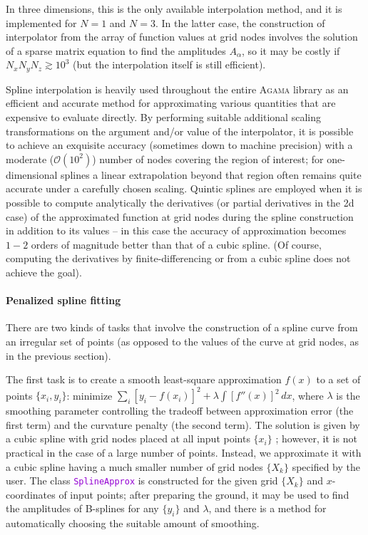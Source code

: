 \documentclass[12pt]{article}
\newcommand{\Agama}{\textsc{Agama}\xspace}
\newcommand{\ttt}[1]{\textcolor{darkviolet}{\texttt{#1}}}
\begin{document}
In three dimensions, this is the only available interpolation method, and it is implemented for $N=1$ and $N=3$. In the latter case, the construction of interpolator from the array of function values at grid nodes involves the solution of a sparse matrix equation to find the amplitudes $A_\alpha$, so it may be costly if $N_xN_yN_z\gtrsim 10^3$ (but the interpolation itself is still efficient). 

Spline interpolation is heavily used throughout the entire \Agama library as an efficient and accurate method for approximating various quantities that are expensive to evaluate directly. By performing suitable additional scaling transformations on the argument and/or value of the interpolator, it is possible to achieve an exquisite accuracy (sometimes down to machine precision) with a moderate ($\mathcal O(10^2)$) number of nodes covering the region of interest; for one-dimensional splines a linear extrapolation beyond that region often remains quite accurate under a carefully chosen scaling. Quintic splines are employed when it is possible to compute analytically the derivatives (or partial derivatives in the 2d case) of the approximated function at grid nodes during the spline construction in addition to its values -- in this case the accuracy of approximation becomes $1-2$ orders of magnitude better than that of a cubic spline. (Of course, computing the derivatives by finite-differencing or from a cubic spline does not achieve the goal).

\paragraph{Penalized spline fitting}  \label{sec:SplineFitting}
There are two kinds of tasks that involve the construction of a spline curve from an irregular set of points (as opposed to the values of the curve at grid nodes, as in the previous section).

The first task is to create a smooth least-square approximation $f(x)$ to a set of points $\{x_i, y_i\}$: 
minimize $\sum_i [y_i-f(x_i)]^2 + \lambda \int [f''(x)]^2\,dx$, where $\lambda$ is the smoothing parameter controlling the tradeoff between approximation error (the first term) and the curvature penalty (the second term). The solution is given by a cubic spline with grid nodes placed at all input points $\{x_i\}$ \cite{GreenSilverman}; however, it is not practical in the case of a large number of points. Instead, we approximate it with a cubic spline having a much smaller number of grid nodes $\{X_k\}$ specified by the user. The class \ttt{SplineApprox} is constructed for the given grid  $\{X_k\}$ and $x$-coordinates of input points; after preparing the ground, it may be used to find the amplitudes of B-splines for any $\{y_i\}$ and $\lambda$, and there is a method for automatically choosing the suitable amount of smoothing.
\end{document}
